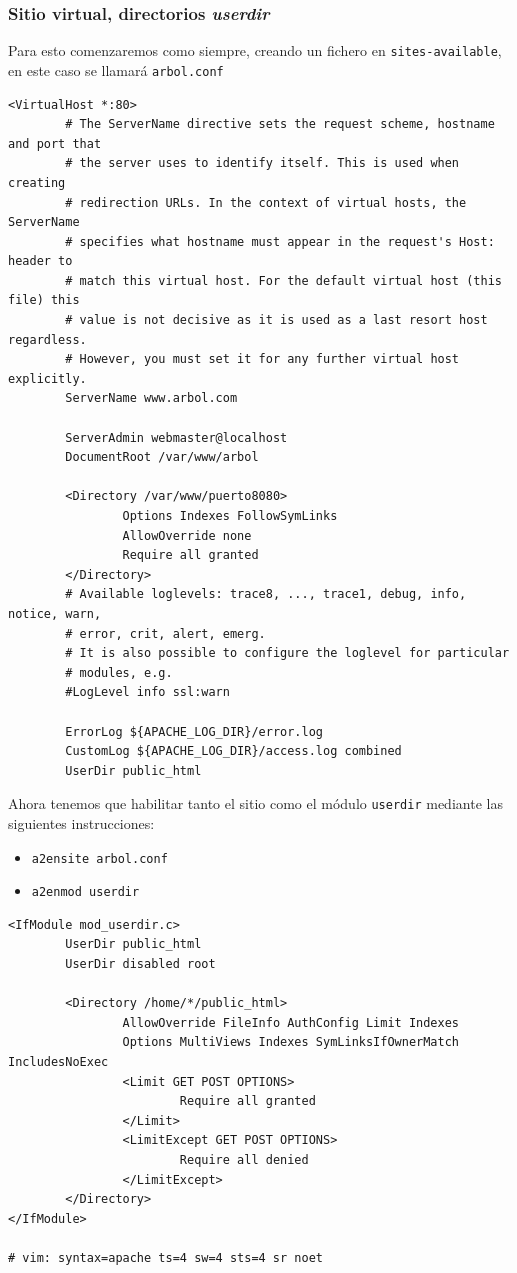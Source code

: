 \documentclass[11pt]{article}
\begin{document}
\subsubsection{Sitio virtual, directorios \emph{userdir}}
\label{sec:orge41505e}
Para esto comenzaremos como siempre, creando un fichero en \texttt{sites-available}, en este caso se llamará \texttt{arbol.conf}
\begin{verbatim}
<VirtualHost *:80>
        # The ServerName directive sets the request scheme, hostname and port that
        # the server uses to identify itself. This is used when creating
        # redirection URLs. In the context of virtual hosts, the ServerName
        # specifies what hostname must appear in the request's Host: header to
        # match this virtual host. For the default virtual host (this file) this
        # value is not decisive as it is used as a last resort host regardless.
        # However, you must set it for any further virtual host explicitly.
        ServerName www.arbol.com

        ServerAdmin webmaster@localhost
        DocumentRoot /var/www/arbol

        <Directory /var/www/puerto8080>
                Options Indexes FollowSymLinks
                AllowOverride none
                Require all granted
        </Directory>
        # Available loglevels: trace8, ..., trace1, debug, info, notice, warn,
        # error, crit, alert, emerg.
        # It is also possible to configure the loglevel for particular
        # modules, e.g.
        #LogLevel info ssl:warn

        ErrorLog ${APACHE_LOG_DIR}/error.log
        CustomLog ${APACHE_LOG_DIR}/access.log combined
        UserDir public_html
\end{verbatim}

Ahora tenemos que habilitar tanto el sitio como el módulo \texttt{userdir} mediante las siguientes instrucciones:
\begin{itemize}
\item \texttt{a2ensite arbol.conf}
\item \texttt{a2enmod userdir}
\end{itemize}

\begin{verbatim}
<IfModule mod_userdir.c>
        UserDir public_html
        UserDir disabled root

        <Directory /home/*/public_html>
                AllowOverride FileInfo AuthConfig Limit Indexes
                Options MultiViews Indexes SymLinksIfOwnerMatch IncludesNoExec
                <Limit GET POST OPTIONS>
                        Require all granted
                </Limit>
                <LimitExcept GET POST OPTIONS>
                        Require all denied
                </LimitExcept>
        </Directory>
</IfModule>

# vim: syntax=apache ts=4 sw=4 sts=4 sr noet
\end{verbatim}
\end{document}
